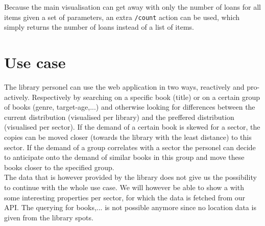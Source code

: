 Because the main visualisation can get away with only the number of loans for all items given a set of parameters, an extra \texttt{/count} action can be used, which simply returns the number of loans instead of a list of items.

\section{Use case}

The library personel can use the web application in two ways, reactively and pro-actively. Respectively by searching on a specific book (title) or on a certain group of books (genre, target-age,...) and otherwise looking for differences between the current distribution (visualised per library) and the preffered distribution (visualised per sector). If the demand of a certain book is skewed for a sector, the copies can be moved closer (towards the library with the least distance) to this sector. If the demand of a group correlates with a sector the personel can decide to anticipate onto the demand of similar books in this group and move these books closer to the specified group.\\

The data that is however provided by the library does not give us the possibility to continue with the whole use case. We will however be able to show a with some interesting properties per sector, for which the data is fetched from our API. The querying for books,... is not possible anymore since no location data is given from the library spots.
